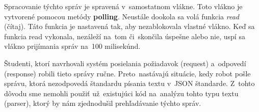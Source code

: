 	Spracovanie týchto správ je spravená v~samostatnom vlákne. Toto vlákno je vytvorené pomocou metódy \textbf{polling}.
	Neustále dookola sa volá funkcia \textit{read} (čítaj). Táto funkcia je nastavená tak, aby nezablokovala vlastné vlákno.
	Keď sa funkcia read vykonala, nezáleží na~tom či~skončila úspešne alebo nie, uspí sa vlákno prijímania správ na~100 milisekúnd.

	Študenti, ktorí navrhovali systém posielania požiadavok (request) a~odpovedí (response) robili tieto správy
	ručne. Preto~nastávajú situácie, kedy robot pošle správu, ktorá nezodpovedá štandardu písania textu v~JSON
	štandarde. Z~tohto dôvodu sme nemohli použiť už~existujúci kód na~analýzu tohto typu textu (parser), ktorý
	by nám zjednodušil prehľadávanie týchto správ.

